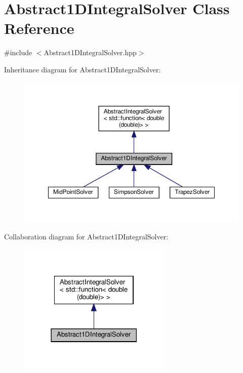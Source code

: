 \hypertarget{class_abstract1_d_integral_solver}{}\section{Abstract1\+D\+Integral\+Solver Class Reference}
\label{class_abstract1_d_integral_solver}


{\ttfamily \#include $<$Abstract1\+D\+Integral\+Solver.\+hpp$>$}



Inheritance diagram for Abstract1\+D\+Integral\+Solver\+:\nopagebreak
\begin{figure}[H]
\begin{center}
\leavevmode
\includegraphics[width=350pt]{class_abstract1_d_integral_solver__inherit__graph}
\end{center}
\end{figure}


Collaboration diagram for Abstract1\+D\+Integral\+Solver\+:\nopagebreak
\begin{figure}[H]
\begin{center}
\leavevmode
\includegraphics[width=206pt]{class_abstract1_d_integral_solver__coll__graph}
\end{center}
\end{figure}
